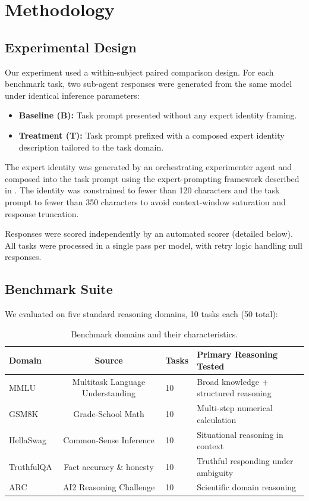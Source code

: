 \documentclass[anonymous, submission, paper]{iclr2026}
\begin{document}
\section{Methodology}

\subsection{Experimental Design}
\label{sec:experimental_design}

Our experiment used a within-subject paired comparison design. For each benchmark task, two sub-agent responses were generated from the same model under identical inference parameters:

\begin{itemize}
  \item \textbf{Baseline (B):} Task prompt presented without any expert identity framing.
  \item \textbf{Treatment (T):} Task prompt prefixed with a composed expert identity description tailored to the task domain.
\end{itemize}

The expert identity was generated by an orchestrating experimenter agent and composed into the task prompt using the expert-prompting framework described in \citep{expertprompting2023}. The identity was constrained to fewer than 120 characters and the task prompt to fewer than 350 characters to avoid context-window saturation and response truncation.

Responses were scored independently by an automated scorer (detailed below). All tasks were processed in a single pass per model, with retry logic handling null responses.

\subsection{Benchmark Suite}
\label{sec:benchmark_suite}

We evaluated on five standard reasoning domains, 10 tasks each (50 total):

\begin{table}[htbp]
  \centering
  \caption{Benchmark domains and their characteristics.}
  \begin{tabular}{@{}lcll@{}}
    \toprule
    \textbf{Domain} & \textbf{Source} & \textbf{Tasks} & \textbf{Primary Reasoning Tested} \\
    \midrule
    MMLU & Multitask Language Understanding & 10 & Broad knowledge + structured reasoning \\
    GSM8K & Grade-School Math & 10 & Multi-step numerical calculation \\
    HellaSwag & Common-Sense Inference & 10 & Situational reasoning in context \\
    TruthfulQA & Fact accuracy \& honesty & 10 & Truthful responding under ambiguity \\
    ARC & AI2 Reasoning Challenge & 10 & Scientific domain reasoning \\
    \bottomrule
  \end{tabular}
  \label{tab:benchmark_domains}
\end{table}
\end{document}
